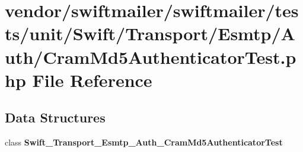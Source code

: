 \section{vendor/swiftmailer/swiftmailer/tests/unit/\+Swift/\+Transport/\+Esmtp/\+Auth/\+Cram\+Md5\+Authenticator\+Test.php File Reference}
\label{_cram_md5_authenticator_test_8php}
\subsection*{Data Structures}
\begin{DoxyCompactItemize}
\item 
class {\bf Swift\+\_\+\+Transport\+\_\+\+Esmtp\+\_\+\+Auth\+\_\+\+Cram\+Md5\+Authenticator\+Test}
\end{DoxyCompactItemize}
